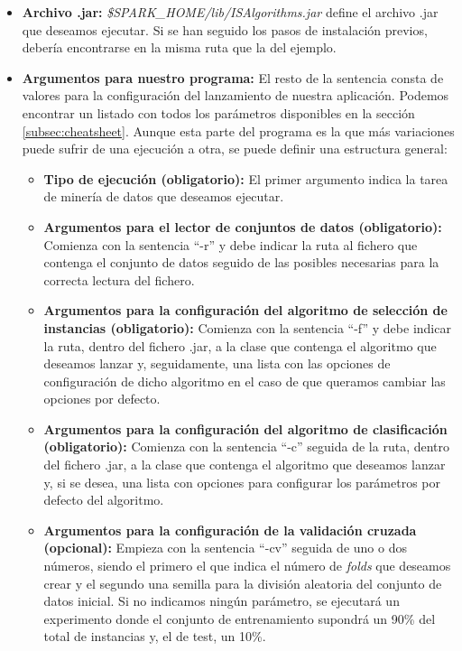 \begin{itemize}
\item \textbf{Archivo .jar:} \textit{\$SPARK\_HOME/lib/ISAlgorithms.jar} define el archivo .jar que deseamos ejecutar. Si se han seguido los pasos de instalación previos, debería encontrarse en la misma ruta que la del ejemplo.

\item \textbf{Argumentos para nuestro programa:} El resto de la sentencia consta de valores para la configuración del lanzamiento de nuestra aplicación. Podemos encontrar un listado con todos los parámetros disponibles en la sección \ref{subsec:cheatsheet}. Aunque esta parte del programa es la que más variaciones puede sufrir de una ejecución a otra, se puede definir una estructura general:
	\begin{itemize}
		\item \textbf{Tipo de ejecución (obligatorio):} El primer argumento indica la tarea de minería de datos que deseamos ejecutar.
		\item \textbf{Argumentos para el lector de conjuntos de datos (obligatorio):} Comienza con la sentencia ``-r'' y debe indicar la ruta al fichero que contenga el conjunto de datos seguido de las posibles necesarias para la correcta lectura del fichero.
		\item \textbf{Argumentos para la configuración del algoritmo de selección de instancias (obligatorio):} Comienza con la sentencia ``-f'' y debe indicar la ruta, dentro del fichero .jar, a la clase que contenga el algoritmo que deseamos lanzar y, seguidamente, una lista con las opciones de configuración de dicho algoritmo en el caso de que queramos cambiar las opciones por defecto.
		\item \textbf{Argumentos para la configuración del algoritmo de clasificación (obligatorio):}  Comienza con la sentencia ``-c'' seguida de la ruta, dentro del fichero .jar, a la clase que contenga el algoritmo que deseamos lanzar y, si se desea, una lista con opciones para configurar los parámetros por defecto del algoritmo.
		\item \textbf{Argumentos para la configuración de la validación cruzada (opcional):} Empieza con la sentencia ``-cv'' seguida de uno o dos números, siendo el primero el que indica el número de \textit{folds} que deseamos crear y el segundo una semilla para la división aleatoria del conjunto de datos inicial. Si no indicamos ningún parámetro, se ejecutará un experimento donde el conjunto de entrenamiento supondrá un 90\% del total de instancias y, el de test, un 10\%.
	\end{itemize}
\end{itemize}

